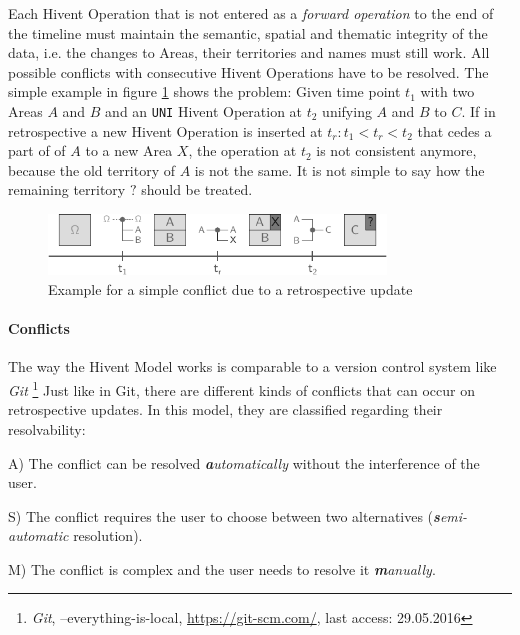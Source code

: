 Each Hivent Operation that is not entered as a \emph{forward operation} to the end of the timeline must maintain the semantic, spatial and thematic integrity of the data, i.e. the changes to Areas, their territories and names must still work. All possible conflicts with consecutive Hivent Operations have to be resolved. The simple example in figure \ref{fig:update_conflict_example} shows the problem: Given time point $t_1$ with two Areas $A$ and $B$ and an \texttt{UNI} Hivent Operation at $t_2$ unifying $A$ and $B$ to $C$. If in retrospective a new Hivent Operation is inserted at $t_r: t_1 < t_r < t_2$ that cedes a part of of $A$ to a new Area $X$, the operation at $t_2$ is not consistent anymore, because the old territory of $A$ is not the same. It is not simple to say how the remaining territory $?$ should be treated.

\begin{figure}[H]
  \vspace{1em}
  \centering
  \includegraphics[width=0.8\textwidth]{graphics/development/update_conflict/example}
  \caption{Example for a simple conflict due to a retrospective update}
  \label{fig:update_conflict_example}
\end{figure}


\paragraph{Conflicts} %
\label{par:conflicts}

The way the Hivent Model works is comparable to a version control system like \emph{Git}
\footnote{
  \emph{Git},
  --everything-is-local,
  \url{https://git-scm.com/},
  last access: 29.05.2016
}
Just like in Git, there are different kinds of conflicts that can occur on retrospective updates. In this model, they are classified regarding their resolvability:

\begin{compactenum}
  \item[A)] The conflict can be resolved \emph{\textbf{a}utomatically} without the interference of the user.
  \item[S)] The conflict requires the user to choose between two alternatives (\emph{\textbf{s}emi-automatic} resolution).
  \item[M)] The conflict is complex and the user needs to resolve it \emph{\textbf{m}anually}.
\end{compactenum}

